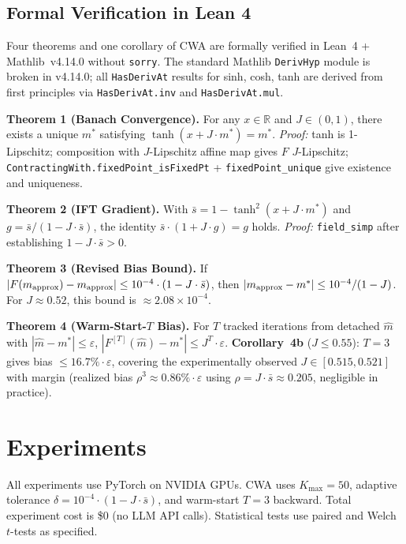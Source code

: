 \documentclass[11pt,twocolumn,letterpaper]{article}
\begin{document}
\subsection{Formal Verification in Lean 4}

Four theorems and one corollary of CWA are formally verified in Lean~4 + Mathlib~v4.14.0 without \texttt{sorry}. The
standard Mathlib \texttt{DerivHyp} module is broken in v4.14.0; all \texttt{HasDerivAt} results for sinh, cosh, tanh are
derived from first principles via \texttt{HasDerivAt.inv} and \texttt{HasDerivAt.mul}.

\textbf{Theorem 1 (Banach Convergence).} For any $x \in \mathbb{R}$ and $J \in (0,1)$, there exists a unique $m^*$
satisfying $\tanh(x + J\cdot m^*) = m^*$. \emph{Proof:} tanh is 1-Lipschitz; composition with $J$-Lipschitz affine map
gives $F$ $J$-Lipschitz; \texttt{ContractingWith.fixedPoint\_isFixedPt} + \texttt{fixedPoint\_unique} give existence and
uniqueness.

\textbf{Theorem 2 (IFT Gradient).} With $\bar{s} = 1 - \tanh^2(x + J\cdot m^*)$ and
$g = \bar{s}/(1 - J\cdot\bar{s})$, the identity $\bar{s}\cdot(1 + J\cdot g) = g$ holds. \emph{Proof:} \texttt{field\_simp}
after establishing $1 - J\cdot\bar{s} > 0$.

\textbf{Theorem 3 (Revised Bias Bound).} If
$|F(m_{\rm approx}) - m_{\rm approx}| \leq 10^{-4}\cdot(1 - J\cdot\bar{s})$, then
$|m_{\rm approx} - m^*| \leq 10^{-4}/(1-J)$. For $J \approx 0.52$, this bound is $\approx 2.08\times 10^{-4}$.

\textbf{Theorem 4 (Warm-Start-$T$ Bias).} For $T$ tracked iterations from detached $\hat{m}$ with
$|\hat{m} - m^*| \leq \varepsilon$, $|F^{[T]}(\hat{m}) - m^*| \leq J^T\cdot\varepsilon$. \textbf{Corollary~4b}
($J \leq 0.55$): $T=3$ gives bias $\leq 16.7\%\cdot\varepsilon$, covering the experimentally observed
$J \in [0.515, 0.521]$ with margin (realized bias $\rho^3 \approx 0.86\%\cdot\varepsilon$ using
$\rho = J\cdot\bar{s} \approx 0.205$, negligible in practice).

\section{Experiments}

All experiments use PyTorch on NVIDIA GPUs. CWA uses $K_{\max} = 50$, adaptive tolerance
$\delta = 10^{-4}\cdot(1 - J\cdot\bar{s})$, and warm-start $T=3$ backward. Total experiment cost is \$0 (no LLM API
calls). Statistical tests use paired and Welch $t$-tests as specified.
\end{document}
